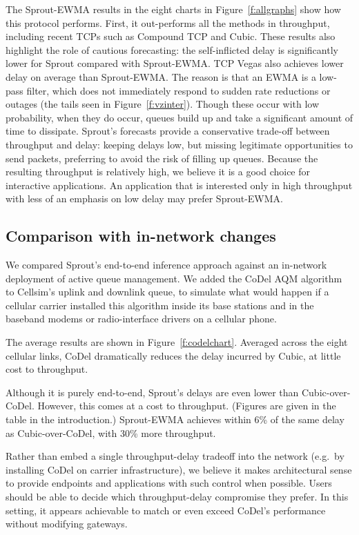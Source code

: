 The Sprout-EWMA results in the eight charts in Figure~\ref{f:allgraphs}
show how this protocol performs. First, it out-performs all the
methods in throughput, including recent TCPs such as Compound TCP and
Cubic. These results also highlight the role of cautious forecasting:
the self-inflicted delay is significantly lower for Sprout compared
with Sprout-EWMA. TCP Vegas also achieves lower delay on average than
Sprout-EWMA. The reason is that an EWMA is a low-pass filter, which
does not immediately respond to sudden rate reductions or outages (the
tails seen in Figure~\ref{f:vzinter}). Though these occur with low
probability, when they do occur, queues build up and take a
significant amount of time to dissipate.  Sprout's forecasts provide a
conservative trade-off between throughput and delay: keeping delays
low, but missing legitimate opportunities to send
packets, preferring to avoid the risk of filling up queues. Because
the resulting throughput is relatively high, we believe it is a good
choice for interactive applications. An application that is interested
only in high throughput with less of an emphasis on low delay may prefer
Sprout-EWMA.

\subsection{Comparison with in-network changes}

We compared Sprout's end-to-end inference approach against an
in-network deployment of active queue management. We added the CoDel
AQM algorithm~\cite{CoDel} to Cellsim's uplink and downlink queue, to
simulate what would happen if a cellular carrier installed this
algorithm inside its base stations and in the baseband modems or
radio-interface drivers on a cellular phone.

The average results are shown in Figure~\ref{f:codelchart}. Averaged
across the eight cellular links, CoDel dramatically reduces the delay
incurred by Cubic, at little cost to throughput.

Although it is purely end-to-end, Sprout's delays are even lower than
Cubic-over-CoDel. However, this comes at a cost to
throughput. (Figures are given in the table in the introduction.)
Sprout-EWMA achieves within 6\% of the same delay as Cubic-over-CoDel,
with 30\% more throughput.

Rather than embed a single throughput-delay tradeoff into the network
(e.g.~by installing CoDel on carrier infrastructure), we believe it
makes architectural sense to provide endpoints and applications with
such control when possible. Users should be able to decide which
throughput-delay compromise they prefer. In this setting, it appears
achievable to match or even exceed CoDel's performance without
modifying gateways.

